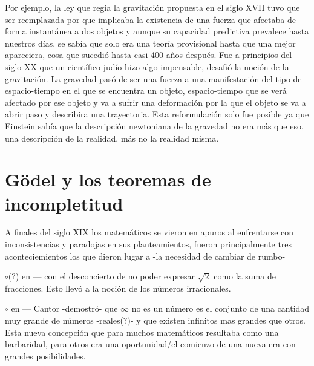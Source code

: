 \documentclass[11pt]{book}
\begin{document}
Por ejemplo, la ley que regía la gravitación propuesta en el siglo XVII tuvo que ser reemplazada por que implicaba la existencia de una fuerza que afectaba de forma instantánea a dos objetos %
y aunque su capacidad predictiva prevalece hasta nuestros días, se sabía %
que solo era una teoría provisional hasta que una mejor apareciera, cosa que sucedió hasta casi 400 años después. Fue a principios del siglo XX que un científico judío hizo algo impensable, desafió la noción de la gravitación. La gravedad pasó de ser una fuerza a una manifestación del tipo de espacio-tiempo en el que se encuentra un objeto, espacio-tiempo que se verá afectado por ese objeto y va a sufrir una deformación por la que el objeto se va a abrir paso y describira una trayectoria.
Esta reformulación solo fue posible ya que Einstein sabía que la descripción newtoniana de la gravedad no era más que eso, una descripción de la realidad, más no la realidad misma.

 
 \section{Gödel y los teoremas de incompletitud }




A finales del siglo XIX los matemáticos se vieron en apuros al enfrentarse con inconsistencias y paradojas en sus planteamientos, fueron principalmente tres aconteciemientos los que dieron lugar a -la necesidad de cambiar de rumbo-

$\circ$(?) en --- con el desconcierto de no poder expresar $\sqrt{2}$ como la suma de fracciones. Esto llevó a la noción de los números irracionales.

$\circ$ en --- Cantor -demostró- que $\infty$ no es un número es el conjunto de una cantidad muy grande de números -reales(?)- y que existen infinitos mas grandes que otros. %
Esta nueva concepción que para muchos matemáticos resultaba como una barbaridad, para otros era una oportunidad/el comienzo de una nueva era con grandes posibilidades. 
\end{document}
